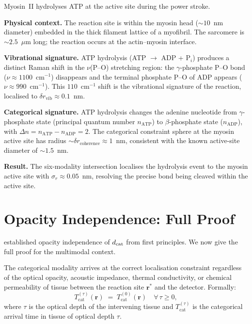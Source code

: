 \begin{example}
\label{ex:muscle}
Myosin~II hydrolyses ATP at the active site during the power stroke.

\textbf{Physical context.}  The reaction site is within the myosin head
($\sim 10$~nm diameter) embedded in the thick filament lattice of a
myofibril.  The sarcomere is $\sim 2.5$~$\mu$m long; the reaction occurs
at the actin--myosin interface.

\textbf{Vibrational signature.}  ATP hydrolysis
(ATP $\to$ ADP + P$_i$) produces a distinct Raman shift in the
$\nu$(P--O) stretching region: the $\gamma$-phosphate P--O bond
($\nu \approx 1100$~cm$^{-1}$) disappears and the terminal phosphate
P--O of ADP appears ($\nu \approx 990$~cm$^{-1}$).  This $110$~cm$^{-1}$
shift is the vibrational signature of the reaction, localised to
$\delta r_\mathrm{vib} \approx 0.1$~nm.

\textbf{Categorical signature.}  ATP hydrolysis changes the adenine
nucleotide from $\gamma$-phosphate state (principal quantum number
$n_\mathrm{ATP}$) to $\beta$-phosphate state ($n_\mathrm{ADP}$), with
$\Delta n = n_\mathrm{ATP} - n_\mathrm{ADP} = 2$.  The categorical
constraint sphere at the myosin active site has radius
$\sim \delta r_\mathrm{coherence} \approx 1$~nm, consistent with the
known active-site diameter of $\sim 1.5$~nm.

\textbf{Result.}  The six-modality intersection localises the hydrolysis
event to the myosin active site with $\sigma_r \approx 0.05$~nm, resolving
the precise bond being cleaved within the active site.
\end{example}

\section{Opacity Independence: Full Proof}
\label{sec:opacity-full-proof}

 established opacity independence of $d_{\mathrm{cat}}$ from
first principles.  We now give the full proof for the multimodal context.

\begin{theorem}
\label{thm:opacity-proof}
The categorical modality arrives at the correct localisation constraint
regardless of the optical opacity, acoustic impedance, thermal conductivity,
or chemical permeability of tissue between the reaction site $\mathbf{r}^*$
and the detector.  Formally:
\[
    T_\mathrm{cat}^{(\tau)}(\mathbf{r}) \;=\; T_\mathrm{cat}^{(0)}(\mathbf{r})
    \quad \forall\, \tau \ge 0,
\]
where $\tau$ is the optical depth of the intervening tissue and $T_\mathrm{cat}^{(\tau)}$
is the categorical arrival time in tissue of optical depth $\tau$.
\end{theorem}

